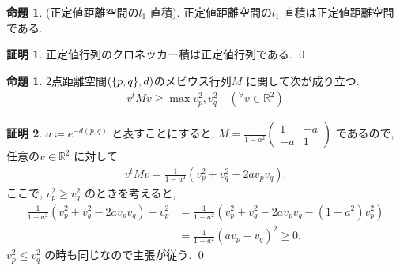 \documentclass[10pt, fleqn, label-section=none]{bxjsarticle}
\theoremstyle{definition}
\newtheorem{prop}[dfn]{命題}
\newtheorem*{pf*}{証明}
\newcommand{\any}{{}^{\forall}}
\newcommand{\cbra}[1]{\mleft\{#1\mright\}}
\renewcommand{\;}{\, ; \,}
\newcommand{\gyouretsu}[1]{\begin{pmatrix} #1 \end{pmatrix} }
\begin{document}
\begin{prop}(正定値距離空間の$l_1$ 直積). 正定値距離空間の$l_1$ 直積は正定値距離空間である. 

\end{prop}
\begin{pf*}
正定値行列のクロネッカー積は正定値行列である. 
\qed
\end{pf*}

\begin{prop}$2$点距離空間$(\cbra{p, q}, d)$のメビウス行列$M$ に関して次が成り立つ. 
\begin{align*} v^t M v \geq \max{v_p ^2 , v_q^2 } \quad (\any v \in \mathbb R^2) \end{align*}
\end{prop}
\begin{pf*}
$a \coloneqq e^{-d(p, q)}$ と表すことにすると, $M = \frac{1}{1 - a^2} \gyouretsu{1 & - a \\ - a & 1}$ であるので, 
任意の$v \in \mathbb R^2$ に対して
\begin{align*} v^t M v = \frac{1}{1 - a^2} (v_p^2 + v_q^2 - 2a v_p v_q) . \end{align*}
ここで, $v_p^2 \geq v_q^2$ のときを考えると, 
\begin{align*} \frac{1}{1 - a^2} (v_p^2 + v_q^2 - 2a v_p v_q) - v_p^2 &= \frac{1}{1 - a^2}  (v_p^2 + v_q^2 - 2a v_p v_q - (1-a^2) v_p^2) \\&=  \frac{1}{1 - a^2}  (av_p - v_q) ^2 \geq 0. \end{align*}
$v_p^2 \leq v_q^2$ の時も同じなので主張が従う. 
\qed
\end{pf*}
\end{document}
